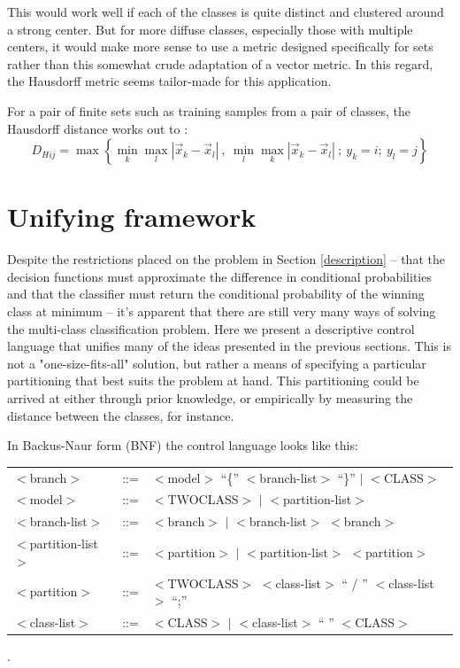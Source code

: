 \documentclass{article}
\begin{document}
This would work well if each of the classes is quite distinct and clustered around a strong center.
But for more diffuse classes, especially those with multiple centers, it would make more sense to use a metric designed specifically for sets rather than this somewhat crude adaptation of a vector metric.
In this regard, the Hausdorff metric seems tailor-made for this application.

For a pair of finite sets such as training samples from a pair of classes,
the Hausdorff distance works out to \citep{Ott1993, Gulick1992}:
\begin{equation}
D_{Hij} = \max \left \lbrace \min_k \max_l | \vec x_k - \vec x_l|~,~\min_l \max_k | \vec x_k - \vec x_l| ~ ;~y_k=i;~y_l=j \right \rbrace
\end{equation}

\section{Unifying framework}

Despite the restrictions placed on the problem in Section \ref{description}
-- that the decision functions must approximate the difference in conditional
probabilities and that the classifier must return the conditional probability
of the winning class at minimum -- it's apparent that there are still 
very many ways of solving the multi-class classification problem.
Here we present a descriptive control language that unifies many of the ideas
presented in the previous sections.
This is not a "one-size-fits-all" solution, but rather a means of specifying
a particular partitioning that best suits the problem at hand.
This partitioning could be arrived at either through prior knowledge, 
or empirically by measuring the distance between the classes, for instance.

In Backus-Naur form (BNF) the control language looks like this:

\begin{tabular}{lcl}
$<$branch$>$ & ::= & $<$model$>$ ``\{'' $<$branch-list$>$ ``\}'' $|$ $<$CLASS$>$\\
$<$model$>$  & ::= & $<$TWOCLASS$>$ $|$ $<$partition-list$>$\\
$<$branch-list$>$ & ::= & $<$branch$>$ $|$ $<$branch-list$>$ $<$branch$>$\\
$<$partition-list$>$ & ::= & $<$partition$>$ $|$ $<$partition-list$>$ $<$partition$>$\\
$<$partition$>$ & ::= & $<$TWOCLASS$>$ $<$class-list$>$ `` / '' $<$class-list$>$ ``;''\\
$<$class-list$>$ & ::= & $<$CLASS$>$ $|$ $<$class-list$>$ `` '' $<$CLASS$>$
\end{tabular}.
\end{document}
